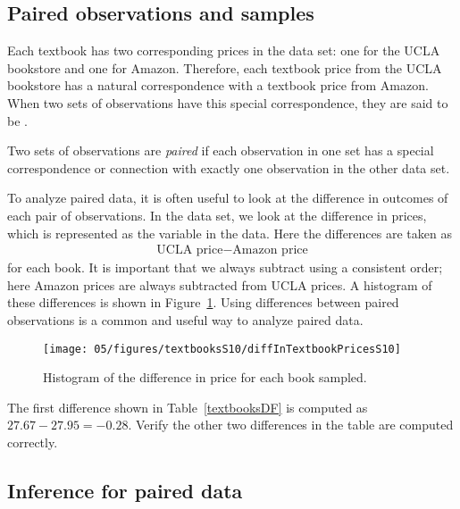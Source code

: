 \subsection{Paired observations and samples}

Each textbook has two corresponding prices in the data set: one for the UCLA bookstore and one for Amazon. Therefore, each textbook price from the UCLA bookstore has a natural correspondence with a textbook price from Amazon. When two sets of observations have this special correspondence, they are said to be .

\begin{termBox}{
Two sets of observations are \emph{paired} if each observation in one set has a special correspondence or connection with exactly one observation in the other data set.}
\end{termBox}

To analyze paired data, it is often useful to look at the difference in outcomes of each pair of observations. In the  data set, we look at the difference in prices, which is represented as the  variable in the  data. Here the differences are taken as
\begin{eqnarray*}
\text{UCLA price} - \text{Amazon price}
\end{eqnarray*}
for each book. It is important that we always subtract using a consistent order; here Amazon prices are always subtracted from UCLA prices. A histogram of these differences is shown in Figure~\ref{diffInTextbookPricesS10}. Using differences between paired observations is a common and useful way to analyze paired data.
\begin{figure}
\centering
\texttt{[image: 05/figures/textbooksS10/diffInTextbookPricesS10]}
\caption{Histogram of the difference in price for each book sampled.}
\label{diffInTextbookPricesS10}
\end{figure}

\begin{exercise}
The first difference shown in Table~\ref{textbooksDF} is computed as $27.67-27.95=-0.28$. Verify the other two differences in the table are computed correctly.
\end{exercise}

\subsection{Inference for paired data}

